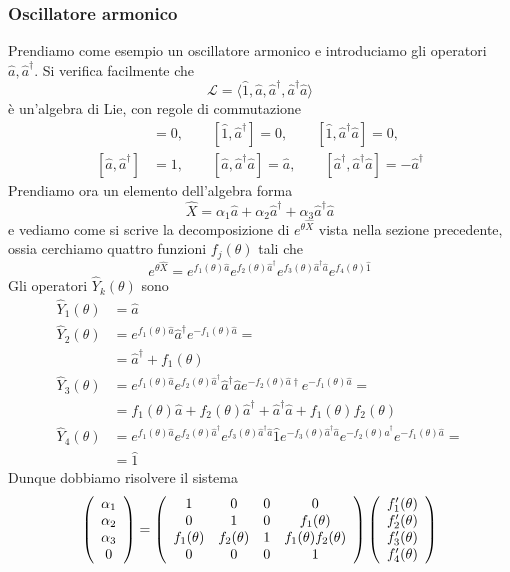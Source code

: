\documentclass[a4paper, 11pt]{article}
\newcommand{\op}[1]{\hat{#1}}
\renewcommand{\op}[1]{\hat{#1}}
\begin{document}
\subsubsection{Oscillatore armonico}
Prendiamo come esempio un oscillatore armonico e introduciamo gli operatori $\op a,\op a^\dagger$. Si verifica facilmente che 
\[\mathcal{L}=\langle \op1,\op a,\op a^\dagger,\op a^\dagger\op a\rangle\]
è un'algebra di Lie, con regole di commutazione
\begin{align*}
	[\op1,\op a]&=0,\qquad[\op1,\op a^\dagger]=0,\qquad[\op1,\op a^\dagger\op a]=0,\\{[\op {a},\op {a}^\dagger]}&=1,\qquad[\op a,\op a^\dagger \op a]=\op a,\qquad[\op a^\dagger,\op a^\dagger\op a]=-\op a^\dagger
\end{align*}
Prendiamo ora un elemento dell'algebra forma
\[\op X=\alpha_1\op a+\alpha_2\op a^\dagger+\alpha_3\op a^\dagger\op a\]
e vediamo come si scrive la decomposizione di $e^{\theta\op X}$ vista nella sezione precedente, ossia cerchiamo quattro funzioni $f_j(\theta)$ tali che
\[e^{\theta\op X}=e^{f_1(\theta)\op a}e^{f_2(\theta)\op a^\dagger}e^{f_3(\theta)\op a^\dagger\op a}e^{f_4(\theta)\op1}\]
Gli operatori $\op Y_k(\theta)$ sono
\begin{align*}
	\op Y_1(\theta)&=\op a\\\op Y_2(\theta)&=e^{f_1(\theta)\op a}\op a^\dagger e^{-f_1(\theta)\op a}=\\&=\op a^\dagger+f_1(\theta)\\\op Y_3(\theta)&=e^{f_1(\theta)\op a}e^{f_2(\theta)\op a^\dagger}\op a^\dagger\op ae^{-f_2(\theta)\op a\dagger}e^{-f_1(\theta)\op a}=\\&=f_1(\theta)\op a+f_2(\theta)\op a^\dagger+\op a^\dagger\op a+f_1(\theta)f_2(\theta)\\\op Y_4(\theta)&=e^{f_1(\theta)\op a}e^{f_2(\theta)\op a^\dagger}e^{f_3(\theta)\op a^\dagger\op a}\op 1e^{-f_3(\theta)\op a^\dagger\op a}e^{-f_2(\theta)\op a^\dagger}e^{-f_1(\theta)\op a}=\\&=\op 1
\end{align*}
Dunque dobbiamo risolvere il sistema
\[\left(\begin{array}{c}
\alpha_1\\\alpha_2\\\alpha_3\\0
\end{array}\right)=\left(\begin{array}{c c c c}
1&0&0&0\\0&1&0&f_1(\theta)\\f_1(\theta)&f_2(\theta)&1&f_1(\theta)f_2(\theta)\\0&0&0&1
\end{array}\right)\left(\begin{array}{c}f_1'(\theta)\\f_2'(\theta)\\f_3'(\theta)\\f_4'(\theta)
\end{array}\right)\]
\end{document}
